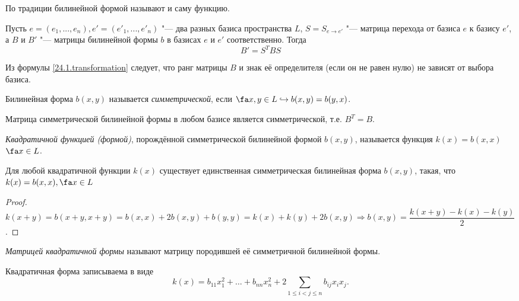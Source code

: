   \begin{notion} 
  По традиции билинейной формой называют и саму функцию.
  \end{notion}

  \begin{stt}
  Пусть $e=(e_1,...,e_n), e'=(e'_1,...,e'_n)$ "--- два разных базиса пространства $L$, $S=S_{e\rightarrow e'}$ "--- матрица перехода от базиса $e$ к базису $e'$, а $B$ и $B'$ "--- матрицы билинейной формы $b$ в базисах $e$ и $e'$ соответственно. Тогда 
  \begin{equation}\label{24.1.transformation}
  B'=S^TBS
  \end{equation}
  
  \end{stt}
  Из формулы \eqref{24.1.transformation} следует, что ранг матрицы $B$ и знак её определителя (если он не равен нулю) не зависят от выбора базиса.
  \begin{defn}
  Билинейная форма $b(x,y)$ называется \textit{симметрической}, если $\fa x,y \in L \hookrightarrow b(x,y)=b(y,x)$.
  \end{defn}
  \begin{stt}
  Матрица симметрической билинейной формы в любом базисе является симметрической, т.е. $B^T=B$.
  \end{stt}
  
  \begin{defn}
  \textit{Квадратичной функцией (формой)}, порождённой симметрической билинейной формой $ b(x,y) $, называется функция $k(x)=b(x,x)$  $\fa x \in L$.
  \end{defn}
  \begin{stt}
  Для любой квадратичной функции $k(x)$ существует единственная симметрическая билинейная форма $b(x,y)$, такая, что $k(x)=b(x,x), \fa x \in L$
  \end{stt}
  \begin{proof}
  $k(x+y)=b(x+y,x+y)=b(x,x)+2b(x,y)+b(y,y)=k(x)+k(y)+2b(x,y) \Rightarrow b(x,y)=\dfrac{k(x+y)-k(x)-k(y)}{2}$.
  \end{proof}
  \begin{defn}
  \textit{Матрицей квадратичной формы} называют матрицу породившей её симметричной билинейной формы.
  \end{defn}
  Квадратичная форма записываема в виде 			  \begin{equation}\label{24.1.common}
  k(x)=b_{11}x_1^2+\ldots+b_{nn}x_n^2+2\sum\limits_{1\le i<j\le n} b_{ij}x_ix_j.
  \end{equation} 
